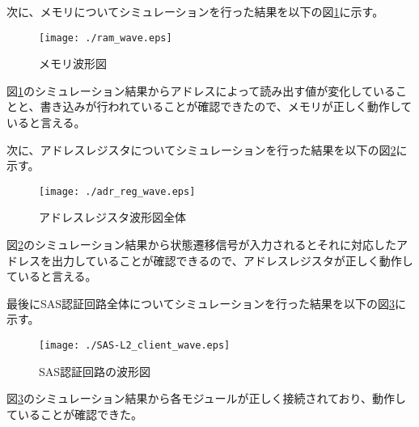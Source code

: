 \documentclass{thesis}
\begin{document}
次に、メモリについてシミュレーションを行った結果を以下の図\ref{RAM_sim}に示す。
\begin{figure}[H]
 \center
 \texttt{[image: ./ram\_wave.eps]}
 \caption{メモリ波形図}
 \label{RAM_sim}
\end{figure}
図\ref{RAM_sim}のシミュレーション結果からアドレスによって読み出す値が変化していることと、書き込みが行われていることが確認できたので、メモリが正しく動作していると言える。\par
次に、アドレスレジスタについてシミュレーションを行った結果を以下の図\ref{アドレスレジスタ_sim}に示す。
\begin{figure}[H]
 \center
 \texttt{[image: ./adr\_reg\_wave.eps]}
 \caption{アドレスレジスタ波形図全体}
 \label{アドレスレジスタ_sim}
\end{figure}
図\ref{アドレスレジスタ_sim}のシミュレーション結果から状態遷移信号が入力されるとそれに対応したアドレスを出力していることが確認できるので、アドレスレジスタが正しく動作していると言える。\par
最後にSAS認証回路全体についてシミュレーションを行った結果を以下の図\ref{全体_sim}に示す。
\begin{figure}[H]
 \center
 \texttt{[image: ./SAS-L2\_client\_wave.eps]}
 \caption{SAS認証回路の波形図}
 \label{全体_sim}
\end{figure}
図\ref{全体_sim}のシミュレーション結果から各モジュールが正しく接続されており、動作していることが確認できた。\par
\end{document}
